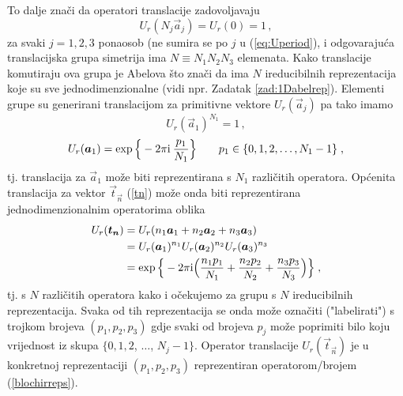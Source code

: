 To dalje znači da operatori translacije zadovoljavaju
\begin{equation}
       U_{r}(N_j \vec{a}_j) = U_{r}(0) = 1 \,,  
       \label{eq:Uperiod}
\end{equation}
za svaki $j=1,2,3$ ponaosob (ne sumira se po $j$ u (\ref{eq:Uperiod}),
i odgovarajuća translacijska grupa simetrija ima $N\equiv N_1 N_2 N_3$
elemenata. Kako translacije komutiraju ova grupa je Abelova što
znači da ima $N$ ireducibilnih reprezentacija koje su
sve jednodimenzionalne (vidi npr. Zadatak \ref{zad:1Dabelrep}).
Elementi grupe su generirani translacijom za primitivne vektore
$U_{r}(\vec{a}_j)$  pa tako imamo
\begin{equation}
U_{r}(\vec{a}_1)^{N_1} = 1  \,,
\end{equation}
\begin{equation}
U_{r}(\vec{a}_1) = \exp\Big\{-2\pi \rmi\: \frac{p_1 }{N_1}\Big\} \qquad 
 p_1 \in \{0,1,2,\ldots ,N_1 -1\} \;,
\end{equation}
tj. translacija za $\vec{a}_1$ može biti reprezentirana s
$N_1$ različitih operatora.  Općenita translacija za vektor 
$\vec{t}_{\vec{n}}$ (\ref{tn}) može onda biti reprezentirana jednodimenzionalnim
operatorima oblika
\begin{align}
 U_{r}(\vec{t}_{\vec{n}}) &=
 U_{r}(n_1 \vec{a}_1 + n_2 \vec{a}_2 + n_3  \vec{a}_3) \\
 &= U_{r}(\vec{a}_1)^{n_1} U_{r}(\vec{a}_2)^{n_2} U_{r}(\vec{a}_3)^{n_3} \\
 &= \exp\Big\{ -2\pi \rmi \Big( \frac{n_1 p_1}{N_1} + \frac{n_2 p_2}{N_2} 
 + \frac{n_3 p_3}{N_3} \Big)\Big\} \;,
\label{blochirreps}
\end{align}
tj. s $N$ različitih operatora kako i očekujemo za grupu s $N$ ireducibilnih
reprezentacija.
Svaka od tih reprezentacija se onda može označiti ("labelirati") s trojkom brojeva $(p_1, p_2, p_3)$
gdje svaki od brojeva $p_j$ može poprimiti bilo koju vrijednost iz
skupa $\{0, 1, 2$, $\ldots$, $N_j -1\}$.
Operator translacije $U_{r}(\vec{t}_{\vec{n}})$ je u konkretnoj reprezentaciji
 $(p_1, p_2, p_3)$ reprezentiran operatorom/brojem (\ref{blochirreps}).
  

